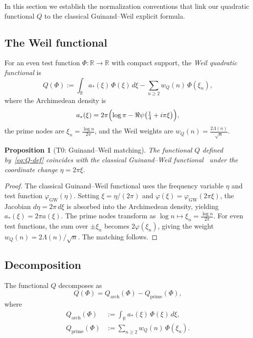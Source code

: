 \documentclass[11pt,a4paper]{article}
\newtheorem{proposition}[theorem]{Proposition}
\theoremstyle{definition}
\theoremstyle{remark}
\newcommand{\R}{\mathbb{R}}
\begin{document}
In this section we establish the normalization conventions that link our quadratic functional $Q$ to the classical Guinand--Weil explicit formula.

\subsection{The Weil functional}

For an even test function $\Phi : \R \to \R$ with compact support, the \emph{Weil quadratic functional} is
\begin{equation}\label{eq:Q-def}
  Q(\Phi) := \int_\R a_*(\xi)\, \Phi(\xi)\, d\xi - \sum_{n \geq 2} w_Q(n)\, \Phi(\xi_n),
\end{equation}
where the Archimedean density is
\begin{equation}\label{eq:astar}
  a_*(\xi) = 2\pi\Bigl(\log\pi - \Re\psi\bigl(\tfrac{1}{4} + i\pi\xi\bigr)\Bigr),
\end{equation}
the prime nodes are $\xi_n = \frac{\log n}{2\pi}$, and the Weil weights are $w_Q(n) = \frac{2\Lambda(n)}{\sqrt{n}}$.

\begin{proposition}[T0: Guinand--Weil matching]\label{prop:T0}
The functional $Q$ defined by~\eqref{eq:Q-def} coincides with the classical Guinand--Weil functional~\cite{Guinand1948,Weil1952} under the coordinate change $\eta = 2\pi\xi$.
\end{proposition}

\begin{proof}
The classical Guinand--Weil functional uses the frequency variable $\eta$ and test function $\varphi_{\mathrm{GW}}(\eta)$. Setting $\xi = \eta/(2\pi)$ and $\varphi(\xi) = \varphi_{\mathrm{GW}}(2\pi\xi)$, the Jacobian $d\eta = 2\pi\, d\xi$ is absorbed into the Archimedean density, yielding $a_*(\xi) = 2\pi a(\xi)$. The prime nodes transform as $\log n \mapsto \xi_n = \frac{\log n}{2\pi}$. For even test functions, the sum over $\pm\xi_n$ becomes $2\varphi(\xi_n)$, giving the weight $w_Q(n) = 2\Lambda(n)/\sqrt{n}$. The matching follows.
\end{proof}

\subsection{Decomposition}

The functional $Q$ decomposes as
\begin{equation}\label{eq:decomp}
  Q(\Phi) = Q_{\mathrm{arch}}(\Phi) - Q_{\mathrm{prime}}(\Phi),
\end{equation}
where
\begin{align}
  Q_{\mathrm{arch}}(\Phi) &:= \int_\R a_*(\xi)\, \Phi(\xi)\, d\xi, \label{eq:Qarch} \\
  Q_{\mathrm{prime}}(\Phi) &:= \sum_{n \geq 2} w_Q(n)\, \Phi(\xi_n). \label{eq:Qprime}
\end{align}
\end{document}
